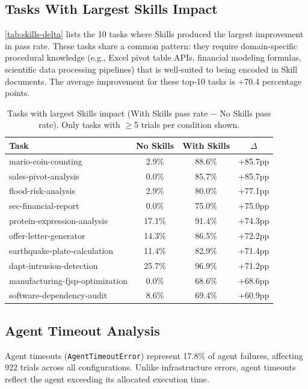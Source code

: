 \subsection{Tasks With Largest Skills Impact}
\label{app:skills-delta}

\autoref{tab:skills-delta} lists the 10 tasks where Skills produced the largest improvement in pass rate. These tasks share a common pattern: they require domain-specific procedural knowledge (e.g., Excel pivot table APIs, financial modeling formulas, scientific data processing pipelines) that is well-suited to being encoded in Skill documents. The average improvement for these top-10 tasks is +70.4 percentage points.

\begin{table}[htb]
\centering
\small
\caption{Tasks with largest Skills impact (With Skills pass rate $-$ No Skills pass rate). Only tasks with $\geq$5 trials per condition shown.}
\label{tab:skills-delta}
\begin{tabular}{lccc}
\toprule
\textbf{Task} & \textbf{No Skills} & \textbf{With Skills} & \textbf{$\Delta$} \\
\midrule
mario-coin-counting & 2.9\% & 88.6\% & +85.7pp \\
sales-pivot-analysis & 0.0\% & 85.7\% & +85.7pp \\
flood-risk-analysis & 2.9\% & 80.0\% & +77.1pp \\
sec-financial-report & 0.0\% & 75.0\% & +75.0pp \\
protein-expression-analysis & 17.1\% & 91.4\% & +74.3pp \\
offer-letter-generator & 14.3\% & 86.5\% & +72.2pp \\
earthquake-plate-calculation & 11.4\% & 82.9\% & +71.4pp \\
dapt-intrusion-detection & 25.7\% & 96.9\% & +71.2pp \\
manufacturing-fjsp-optimization & 0.0\% & 68.6\% & +68.6pp \\
software-dependency-audit & 8.6\% & 69.4\% & +60.9pp \\
\bottomrule
\end{tabular}
\end{table}

\subsection{Agent Timeout Analysis}

Agent timeouts (\texttt{AgentTimeoutError}) represent 17.8\% of agent failures, affecting 922 trials across all configurations. Unlike infrastructure errors, agent timeouts reflect the agent exceeding its allocated execution time.


